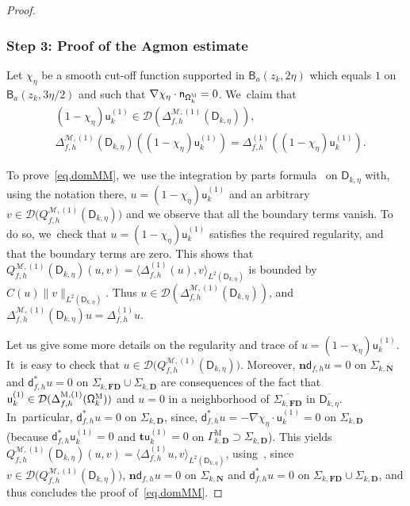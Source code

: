 \documentclass[10pt]{amsart}
\newcommand{\ft}[1]{\mathsf{#1}}
\newcommand{\mbf}[1]{\mathbf{#1}}
\theoremstyle{plain}
\theoremstyle{definition}
\begin{document}
\begin{proof}
\subsubsection*{Step 3: Proof of the Agmon estimate}
Let $\chi_\eta$ be a smooth cut-off function supported in $\mathsf
B_{a}(z_k,2\eta)$ which equals $1$ on $\mathsf B_{a}(z_k,3\eta/2)$ and such that $
\nabla \chi_\eta \cdot \ft n_{\mathsf \Omega_k^{\textsc{M}}} =0$. We~claim that
\begin{equation}\label{eq.domMM}
\begin{aligned}
&(1-\chi_\eta)\mathsf u^{(1)}_k\in \mathcal D(\Delta_{f,h}^{
\mathcal M,(1)} (\mathsf D_{k,\eta})),\\
& \Delta_{f,h}^{ \mathcal M,(1)} (\mathsf D_{k,\eta})((1-\chi_\eta)\mathsf u^{(1)}_k) = \Delta_{f,h}^{(1)}
((1-\chi_\eta)\mathsf u^{(1)}_k).
\end{aligned}
\end{equation}

To prove~\eqref{eq.domMM}, we~use the integration
by parts formula~\cite[Eq.\,(120)]{DLLN} on $\mathsf D_{k,\eta}$ with,
using the notation there,
$u=(1-\chi_\eta) \mathsf u^{(1)}_k$ and an arbitrary $v\in \mathcal D\bigl(Q_{f,h}^{ \mathcal M,(1)} (\mathsf D_{k,\eta})\bigr)$ and we
observe that all the boundary terms vanish. To do
so, we~check that $u=(1-\chi_\eta) \mathsf u^{(1)}_k$ satisfies the
required regularity, and that the boundary terms are zero. This
shows that $Q_{f,h}^{ \mathcal M,(1)} (\mathsf D_{k,\eta})(u,v) = \langle \Delta_{f,h}^{(1)}(u),v \rangle_{L^2(\mathsf D_{k,\eta})}$ is bounded by $ C(u) \|v\|_{L^2(\mathsf D_{k,\eta})} $. Thus $u \in
\mathcal D(\Delta_{f,h}^{ \mathcal M,(1)} (\mathsf D_{k,\eta}))$, and $\Delta_{f,h}^{ \mathcal M,(1)} (\mathsf D_{k,\eta}) u
= \Delta_{f,h}^{(1)}u $.

Let us give some more details on the regularity and trace of
$u=(1-\chi_\eta) \mathsf u^{(1)}_k$. It~is easy to check that $u \in \mathcal D\bigl(Q_{f,h}^{ \mathcal M,(1)} (\mathsf D_{k,\eta})\big)$. Moreover, $\mathbf
n\mathsf d_{f,h}u=0$ on $\Sigma_{k, \mbf N}$ and $\mathsf
d^*_{f,h}u=0$ on $\Sigma_{k, \mbf {FD}}\cup \Sigma_{k, \mbf {D}}$ are
consequences of the fact that $\mathsf u^{(1)}_k\in \mathcal
D(\Delta_{f,h}^{\text{M}, (1)}(\mathsf \Omega_k^{\textsc{M}}))$ and $u=0$ in a neighborhood of $\overline{\Sigma_{k, \mbf
{FD}}}$ in $\overline{\mathsf D_{k,\eta} }$. In~particular, $\mathsf d^*_{f,h}u=0 \text{ on } \Sigma_{k, \mbf {D}}$,
since, $\mathsf d_{f,h}^*u=-\nabla \chi_\eta\cdot \mathsf
u^{(1)}_k=0$ on $\Sigma_{k, \mbf D}$ (because $\mathsf d_{f,h}^*\mathsf u^{(1)}_k=0$ and $\mathbf t\mathsf
u^{(1)}_k=0$ on $\Gamma_{k,
\mbf D}^{\text{M}}\supset \Sigma_{k, \mbf D}$). This yields
$Q_{f,h}^{ \mathcal M,(1)} (\mathsf D_{k,\eta})(u,v) = \langle \Delta_{f,h}^{(1)}u,v \rangle_{L^2(\mathsf
D_{k,\eta})}$, using~\cite[Eq.\,(120)]{DLLN}, since $v\in \mathcal D\bigl(Q_{f,h}^{ \mathcal M,(1)} (\mathsf D_{k,\eta})\bigr)$, $\mathbf
n\mathsf d_{f,h}u=0$ on $\Sigma_{k, \mbf N}$ and $\mathsf
d^*_{f,h}u=0$ on $\Sigma_{k, \mbf {FD}}\cup \Sigma_{k, \mbf {D}}$, and
thus concludes the proof of~\ref{eq.domMM}.


\end{proof}
\end{document}
